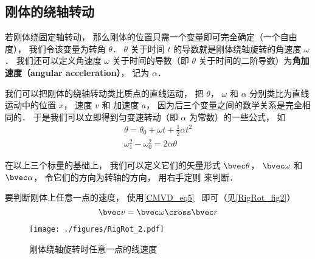 

\subsection{刚体的绕轴转动}
若刚体绕固定轴转动， 那么刚体的位置只需一个变量即可完全确定（一个自由度）， 我们令该变量为转角 $\theta$． $\theta$ 关于时间 $t$ 的导数就是刚体绕轴旋转的角速度 $\omega$． 我们还可以定义角速度 $\omega$ 关于时间的导数（即 $\theta$ 关于时间的二阶导数）为\textbf{角加速度（angular acceleration）}， 记为 $\alpha$．

我们可以把刚体的绕轴转动类比质点的直线运动， 把 $\theta$， $\omega$ 和 $\alpha$ 分别类比为直线运动中的位置 $x$， 速度 $v$ 和 加速度 $a$， 因为后三个变量之间的数学关系是完全相同的． 于是我们可以立即得到匀变速转动（即 $\alpha$ 为常数）的一些公式， 如
\begin{gather}
\theta = \theta_0 + \omega t + \frac12 \alpha t^2\\
\omega_1^2 - \omega_0^2 = 2\alpha \theta
\end{gather}

在以上三个标量的基础上， 我们可以定义它们的矢量形式 $\bvec \theta$， $\bvec \omega$ 和 $\bvec \alpha$， 令它们的方向为转轴的方向， 用右手定则 来判断．

要判断刚体上任意一点的速度， 使用\autoref{CMVD_eq5}~ 即可（见\autoref{RigRot_fig2}）
\begin{equation}
\bvec v = \bvec \omega \cross \bvec r
\end{equation}

\begin{figure}[ht]
\centering
\texttt{[image: ./figures/RigRot\_2.pdf]}
\caption{刚体绕轴旋转时任意一点的线速度} \label{RigRot_fig2}
\end{figure}

